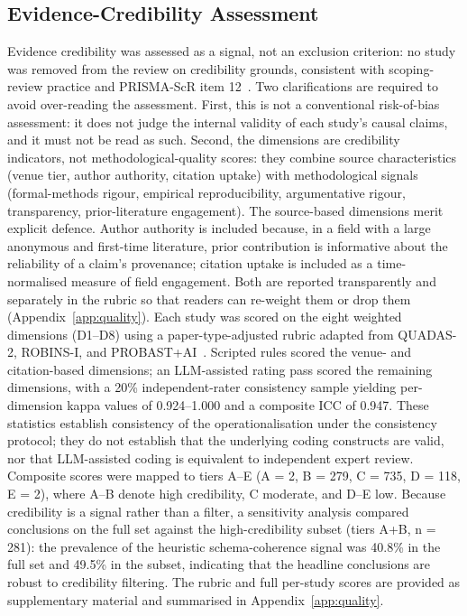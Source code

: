 \subsection{Evidence-Credibility Assessment}
Evidence credibility was assessed as a signal, not an exclusion criterion: no study was removed from the review on credibility grounds, consistent with scoping-review practice and PRISMA-ScR item 12~\cite{tricco2018prismascr}. Two clarifications are required to avoid over-reading the assessment. First, this is not a conventional risk-of-bias assessment: it does not judge the internal validity of each study's causal claims, and it must not be read as such. Second, the dimensions are credibility indicators, not methodological-quality scores: they combine source characteristics (venue tier, author authority, citation uptake) with methodological signals (formal-methods rigour, empirical reproducibility, argumentative rigour, transparency, prior-literature engagement). The source-based dimensions merit explicit defence. Author authority is included because, in a field with a large anonymous and first-time literature, prior contribution is informative about the reliability of a claim's provenance; citation uptake is included as a time-normalised measure of field engagement. Both are reported transparently and separately in the rubric so that readers can re-weight them or drop them (Appendix~\ref{app:quality}). Each study was scored on the eight weighted dimensions (D1--D8) using a paper-type-adjusted rubric adapted from QUADAS-2, ROBINS-I, and PROBAST+AI~\cite{whiting2011quadas2,sterne2016robinsi,moons2025probastaialpha}. Scripted rules scored the venue- and citation-based dimensions; an LLM-assisted rating pass scored the remaining dimensions, with a 20\% independent-rater consistency sample yielding per-dimension kappa values of 0.924--1.000 and a composite ICC of 0.947. These statistics establish consistency of the operationalisation under the consistency protocol; they do not establish that the underlying coding constructs are valid, nor that LLM-assisted coding is equivalent to independent expert review. Composite scores were mapped to tiers A--E (A = 2, B = 279, C = 735, D = 118, E = 2), where A--B denote high credibility, C moderate, and D--E low. Because credibility is a signal rather than a filter, a sensitivity analysis compared conclusions on the full set against the high-credibility subset (tiers A+B, n = 281): the prevalence of the heuristic schema-coherence signal was 40.8\% in the full set and 49.5\% in the subset, indicating that the headline conclusions are robust to credibility filtering. The rubric and full per-study scores are provided as supplementary material and summarised in Appendix~\ref{app:quality}.

